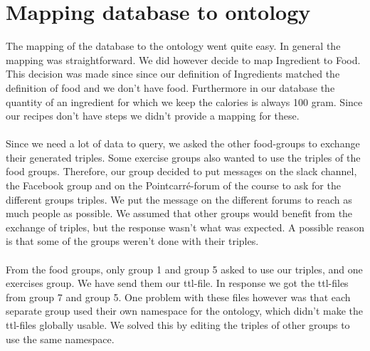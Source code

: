 \section{Mapping database to ontology}
The mapping of the database to the ontology went quite easy. In general the mapping was straightforward. We did however decide to map Ingredient to Food. This decision was made since since our definition of Ingredients matched the definition of food and we don't have food. Furthermore in our database the quantity of an ingredient for which we keep the calories is always 100 gram. Since our recipes don't have steps we didn't provide a mapping for these. 
\\ \\
Since we need a lot of data to query, we asked the other food-groups to exchange their generated triples. Some exercise groups also wanted to use the triples of the food groups. Therefore, our group decided to put messages on the slack channel, the Facebook group and on the Pointcarré-forum of the course to ask for the different groups triples. We put the message on the different forums to reach as much people as possible. We assumed that other groups would benefit from the exchange of triples, but the response wasn't what was expected. A possible reason is that some of the groups weren't done with their triples.
\\ \\
From the food groups, only group 1 and group 5 asked to use our triples, and one exercises group. We have send them our ttl-file. In response we got the ttl-files from group 7 and group 5. One problem with these files however was that each separate group used their own namespace for the ontology, which didn't make the ttl-files globally usable. We solved this by editing the triples of other groups to use the same namespace.

